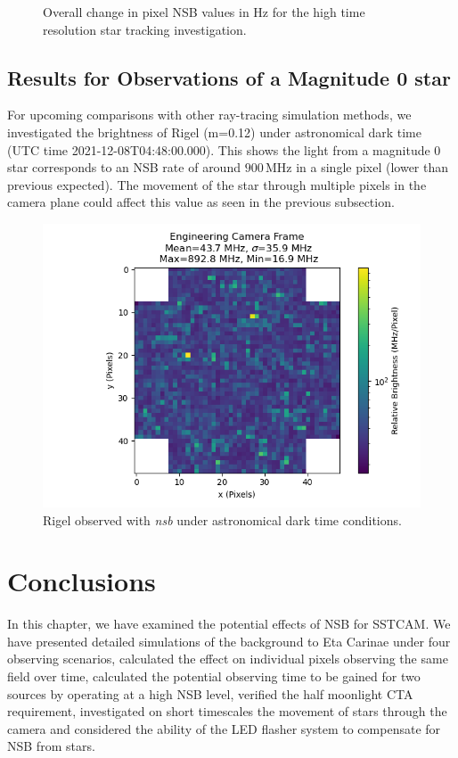 \begin{figure}[ht]
\begin{minipage}{\linewidth}
\caption{Overall change in pixel NSB values in Hz for the high time resolution star tracking investigation.}

\end{minipage}
\label{fig:zenithpixelchange}
\end{figure} 

\subsection{Results for Observations of a Magnitude 0 star}
For upcoming comparisons with other ray-tracing simulation methods, we investigated the brightness of Rigel (m=0.12) under astronomical dark time (UTC time 2021-12-08T04:48:00.000). This shows the light from a magnitude 0 star corresponds to an NSB rate of around $\mathrm{900\,MHz}$ in a single pixel (lower than previous expected). The movement of the star through multiple pixels in the camera plane could affect this value as seen in the previous subsection.
\begin{figure}[h]
\begin{centering}
\includegraphics[width=0.7\columnwidth]{./figures/Hz_pixel_Rigel.png}
\caption{Rigel observed with \textit{nsb} under astronomical dark time conditions.}
\label{fig:rigel}
\end{centering}
\end{figure}
\section{Conclusions}

In this chapter, we have examined the potential effects of NSB for SSTCAM. We have presented detailed simulations of the background to Eta Carinae under four observing scenarios, calculated the effect on individual pixels observing the same field over time, calculated the potential observing time to be gained for two sources by operating at a high NSB level, verified the half moonlight CTA requirement, investigated on short timescales the movement of stars through the camera and considered the ability of the LED flasher system to compensate for NSB from stars.

